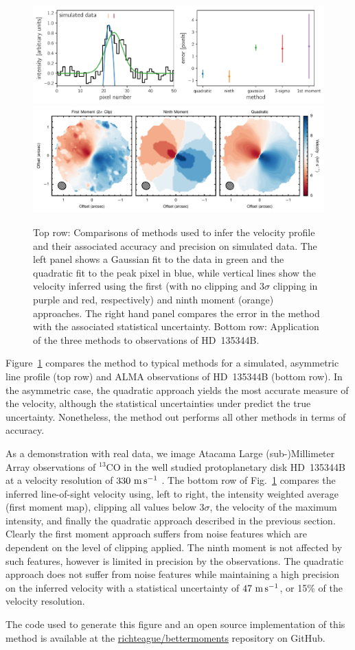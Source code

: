 \documentclass[rnaas]{aastex62}
\begin{document}
\begin{figure}[htbp]
\centering
\includegraphics[width=\textwidth]{../notebooks/simulated-spectrum.pdf}
\includegraphics[width=\textwidth]{../notebooks/moment_comparison.pdf}
\caption{Top row: Comparisons of methods used to infer the velocity profile and their associated accuracy and precision on simulated data. The left panel shows a Gaussian fit to the data in green and the quadratic fit to the peak pixel in blue, while vertical lines show the velocity inferred using the first (with no clipping and $3\sigma$ clipping in purple and red, respectively) and ninth moment (orange) approaches. The right hand panel compares the error in the method with the associated statistical uncertainty. Bottom row: Application of the three methods to observations of HD~135344B. \label{figure}}
\end{figure}


Figure~\ref{figure} compares the method to typical methods for a simulated, asymmetric line profile (top row) and ALMA observations of HD~135344B (bottom row). In the asymmetric case, the quadratic approach yields the most accurate measure of the velocity, although the statistical uncertainties under predict the true uncertainty. Nonetheless, the method out performs all other methods in terms of accuracy.

As a demonstration with real data, we image Atacama Large (sub-)Millimeter Array observations of $^{13}$CO in the well studied protoplanetary disk HD~135344B at a velocity resolution of $330~{\rm m\,s^{-1}}$ \citep[ALMA Project 2012.1.00158.S]{vanderMarel:2016} . The bottom row of Fig.~\ref{figure} compares the inferred line-of-sight velocity using, left to right, the intensity weighted average (first moment map), clipping all values below $3\sigma$, the velocity of the maximum intensity, and finally the quadratic approach described in the previous section. Clearly the first moment approach suffers from noise features which are dependent on the level of clipping applied. The ninth moment is not affected by such features, however is limited in precision by the observations. The quadratic approach does not suffer from noise features while maintaining a high precision on the inferred velocity with a statistical uncertainty of $47~{\rm m\,s^{-1}}$, or 15\% of the velocity resolution.

The code used to generate this figure and an open source implementation of this method is available at the \href{https://github.com/richteague/bettermoments}{richteague/bettermoments} repository on GitHub.


\end{document}
